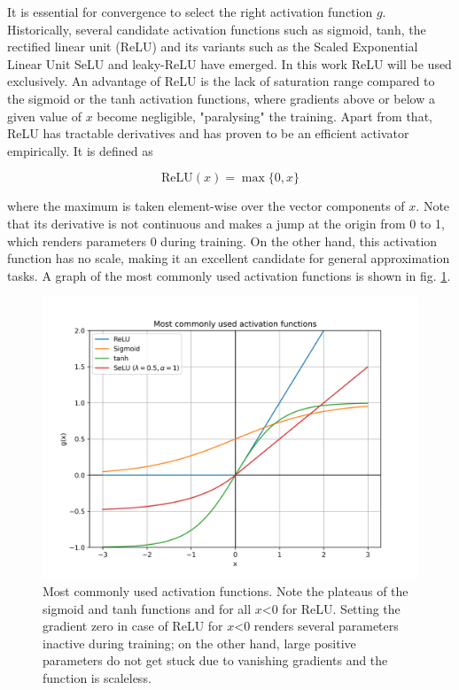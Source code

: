 It is essential for convergence to select the right activation function $g$. Historically, several candidate activation functions such as sigmoid, tanh, the rectified linear unit (ReLU) and its variants such as the Scaled Exponential Linear Unit SeLU and leaky-ReLU have emerged. In this work ReLU will be used exclusively. An advantage of ReLU is the lack of saturation range compared to the sigmoid or the tanh activation functions, where gradients above or below a given value of $x$ become negligible, "paralysing" the training. Apart from that, ReLU has tractable derivatives and has proven to be an efficient activator empirically. It is defined as

\begin{equation*}
	\text{ReLU}(x) = \max \{0, x\}
\end{equation*}

where the maximum is taken element-wise over the vector components of $x$. Note that its derivative is not continuous and makes a jump at the origin from 0 to 1, which renders parameters 0 during training. On the other hand, this activation function has no scale, making it an excellent candidate for general approximation tasks. A graph of the most commonly used activation functions is shown in fig. \ref{fig:activations}.

\begin{figure}
	\centering
	\includegraphics[width=0.7\linewidth]{figures/neural_networks/activations}
	\caption{Most commonly used activation functions. Note the plateaus of the sigmoid and tanh functions and for all $x$<0 for ReLU. Setting the gradient zero in case of ReLU for $x$<0 renders several parameters inactive during training; on the other hand, large positive parameters do not get stuck due to vanishing gradients and the function is scaleless.}
	\label{fig:activations}
\end{figure}

